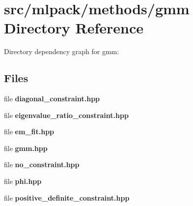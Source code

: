 \section{src/mlpack/methods/gmm Directory Reference}
\label{dir_25a49701d3e8349cd2fe0c30f5736013}
Directory dependency graph for gmm\-:
\subsection*{Files}
\begin{DoxyCompactItemize}
\item 
file {\bf diagonal\-\_\-constraint.\-hpp}
\item 
file {\bf eigenvalue\-\_\-ratio\-\_\-constraint.\-hpp}
\item 
file {\bf em\-\_\-fit.\-hpp}
\item 
file {\bf gmm.\-hpp}
\item 
file {\bf no\-\_\-constraint.\-hpp}
\item 
file {\bf phi.\-hpp}
\item 
file {\bf positive\-\_\-definite\-\_\-constraint.\-hpp}
\end{DoxyCompactItemize}

